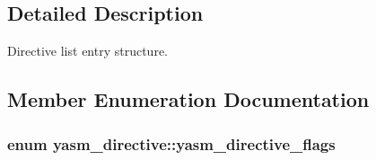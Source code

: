 \subsection{Detailed Description}
Directive list entry structure. 

\subsection{Member Enumeration Documentation}
\hypertarget{structyasm__directive_af2d4bb52875d377ffd49e76515515104}{
\subsubsection[{yasm\-\_\-directive\-\_\-flags}]{\setlength{\rightskip}{0pt plus 5cm}enum {\bf yasm\-\_\-directive\-::yasm\-\_\-directive\-\_\-flags}}}\label{structyasm__directive_af2d4bb52875d377ffd49e76515515104}
